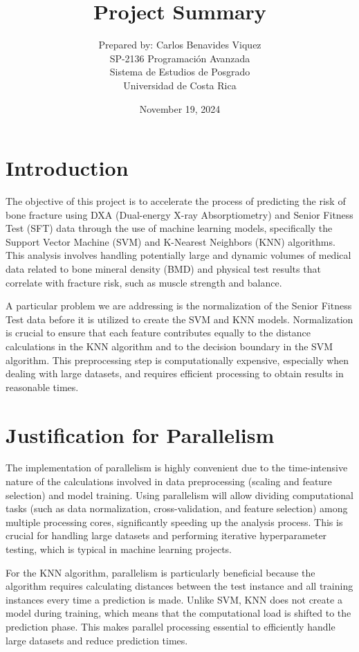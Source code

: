 \documentclass[a4paper,12pt]{report}
\title{Project Summary}
\author{Prepared by: Carlos Benavides Viquez\\
SP-2136 Programación Avanzada\\
Sistema de Estudios de Posgrado\\
Universidad de Costa Rica}
\date{November 19, 2024}
\begin{document}
\maketitle

\tableofcontents

\chapter{Introduction}
The objective of this project is to accelerate the process of predicting the risk of bone fracture using DXA (Dual-energy X-ray Absorptiometry) and Senior Fitness Test (SFT) data through the use of machine learning models, specifically the Support Vector Machine (SVM) and K-Nearest Neighbors (KNN) algorithms. This analysis involves handling potentially large and dynamic volumes of medical data related to bone mineral density (BMD) and physical test results that correlate with fracture risk, such as muscle strength and balance.

A particular problem we are addressing is the normalization of the Senior Fitness Test data before it is utilized to create the SVM and KNN models. Normalization is crucial to ensure that each feature contributes equally to the distance calculations in the KNN algorithm and to the decision boundary in the SVM algorithm. This preprocessing step is computationally expensive, especially when dealing with large datasets, and requires efficient processing to obtain results in reasonable times.

\chapter{Justification for Parallelism}
The implementation of parallelism is highly convenient due to the time-intensive nature of the calculations involved in data preprocessing (scaling and feature selection) and model training. Using parallelism will allow dividing computational tasks (such as data normalization, cross-validation, and feature selection) among multiple processing cores, significantly speeding up the analysis process. This is crucial for handling large datasets and performing iterative hyperparameter testing, which is typical in machine learning projects.

For the KNN algorithm, parallelism is particularly beneficial because the algorithm requires calculating distances between the test instance and all training instances every time a prediction is made. Unlike SVM, KNN does not create a model during training, which means that the computational load is shifted to the prediction phase. This makes parallel processing essential to efficiently handle large datasets and reduce prediction times.
\end{document}
